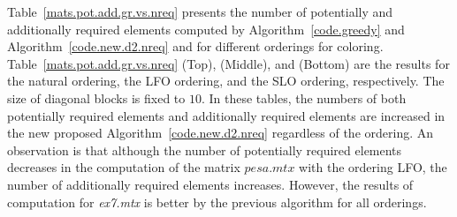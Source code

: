 \documentclass[12pt, twoside,a4paper,toc=bibliography]{scrbook}
\newcommand{\coderef}[1]{Algorithm~\protect\ref{#1}}
\begin{document}
Table~\ref{mats.pot.add.gr.vs.nreq} presents the number of potentially
and additionally required elements computed
by \coderef{code.greedy} and \coderef{code.new.d2.nreq}
and for different orderings for coloring.
Table~\ref{mats.pot.add.gr.vs.nreq} (Top), (Middle), and (Bottom) are
the results for the natural ordering, the LFO ordering, and the SLO ordering, respectively.
The size of diagonal blocks is fixed to $10$.
In these tables, the numbers of both potentially required elements and additionally required elements 
are increased in the new proposed \coderef{code.new.d2.nreq} regardless of the ordering.
An observation is that although the number of potentially required elements decreases 
in the computation of the matrix $pesa.mtx$ with the ordering LFO,
the number of additionally required elements increases. However, 
the results of computation for \textit{ex7.mtx} is better by the previous algorithm 
for all orderings.
\end{document}

